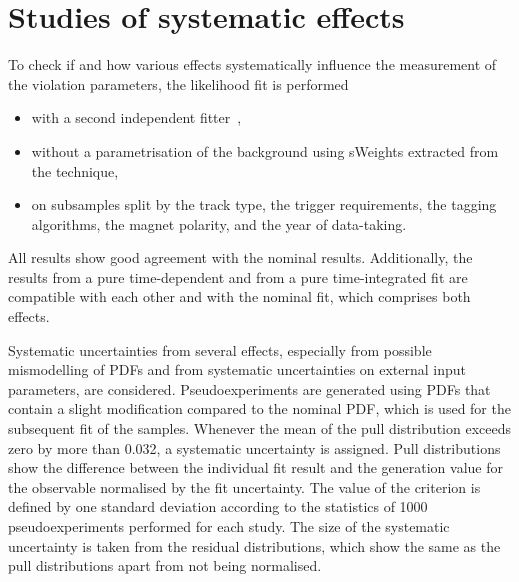 
\section{Studies of systematic effects}
\label{sec:bd2jpsiks:systematics}

To check if and how various effects systematically influence the measurement
of the \CP violation parameters, the likelihood fit is performed
\begin{itemize}
    \item with a second independent fitter~\cite{Cauet-PhDThesis},
    \item without a parametrisation of the background using sWeights extracted
    from the \sPlot technique,
    \item  on subsamples split by the \KS track type, the trigger
    requirements, the tagging algorithms, the magnet polarity, and the year of
    data-taking.
\end{itemize}
All results show good agreement with the nominal results. Additionally, the
results from a pure time-dependent and from a pure time-integrated fit are
compatible with each other and with the nominal fit, which comprises both
effects.

Systematic uncertainties from several effects, especially from possible
mismodelling of PDFs and from systematic uncertainties on external input
parameters, are considered. Pseudoexperiments are generated using PDFs that
contain a slight modification compared to the nominal PDF, which is used for
the subsequent fit of the samples. Whenever the mean of the pull distribution
exceeds zero by more than \num{0.032}, a systematic uncertainty is assigned.
Pull distributions show the difference between the individual fit result and
the generation value for the \CP observable normalised by the fit uncertainty.
The value of the criterion is defined by one standard deviation according to
the statistics of \num{1000} pseudoexperiments performed for each study. The
size of the systematic uncertainty is taken from the residual distributions,
which show the same as the pull distributions apart from not being normalised.

